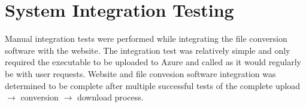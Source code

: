 
\section{System Integration Testing}
Manual integration tests were performed while integrating the file conversion software with the website. The integration test was relatively simple and only required the executable to be uploaded to Azure and called as it would regularly be with user requests. Website and file convesion software integration was determined to be complete after multiple successful tests of the complete upload $\rightarrow$ conversion $\rightarrow$ download process.